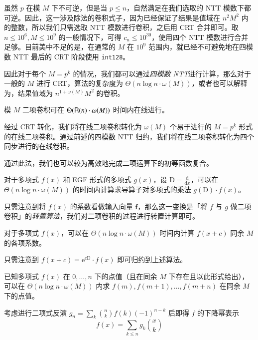 虽然 $p$ 在模 $M$ 下不可逆，但是当 $p\le n$，自然满足在我们选取的 NTT 模数下都可逆。因此，这一涉及除法的卷积式子，因为已经保证了结果是值域在 $n^2M^2$ 内的整数，所以我们只需选取 NTT 模数进行卷积，之后用 CRT 合并即可。取 $n\le 10^6, M\le 10^9$ 的一般情况下，可得 $c_n \le 10^{30}$，使用四个 NTT 模数进行合并足够。目前美中不足的是，在通常的 $M$ 在 $10^9$ 范围内，就已经不可避免地在四模数 NTT 最后的 CRT 阶段使用 \texttt{int128}。

因此对于每个 $M=p^k$ 的情况，我们都可以通过\emph{四模数 NTT}进行计算，那么对于一般的 $M$ 进行 CRT，算法的复杂度为 $\Theta(n\log n \cdot \omega(M))$，或者也可以解释为，结果值域为 $n^{1+\omega(M)}M^2$ 的卷积。

\begin{theorem}
模 $M$ 二项卷积可在 $\Theta(\mathsf R(n)\cdot \omega(M))$ 时间内在线进行。
\end{theorem}

经过 CRT 转化，我们将在线二项卷积转化为 $\omega(M)$ 个易于进行的 $M=p^k$ 形式的在线二项卷积。通过前述的四模数 NTT 归约，我们将在线二项卷积转化为四个同步进行的在线卷积。

通过此法，我们也可以较为高效地完成二项运算下的初等函数复合。

\begin{theorem}
对于多项式 $f(x)$ 和 EGF 形式的多项式 $g(x)$，设 $\mathrm{D} = \frac{\mathrm{d}}{\mathrm{d}x}$，可以在 $\Theta(n\log n \cdot \omega(M))$ 的时间内计算求导算子对多项式的乘法 $g(\mathrm{D}) \cdot f(x)$。
\end{theorem}

只需注意到将 $f(x)$ 的系数看做输入向量 $\mathbf f$，那么这一变换是「将 $f$ 与 $g$ 做二项卷积」的\emph{转置算法}，我们对二项卷积的过程进行转置计算即可。

\begin{lemma}
对于多项式 $f(x)$，可以在 $\Theta(n\log n \cdot \omega(M))$ 时间内计算 $f(x+c)$ 同余 $M$ 的各项系数。
\end{lemma}

只需注意到 $f(x+c) = \mathrm{e}^{c\mathrm{D}} \cdot f(x)$ 即可归约到上述算法。

\begin{lemma}
已知多项式 $f(x)$ 在 $0,\dots,n$ 下的点值（且在同余 $M$ 下存在且以此形式给出），可以在 $\Theta(n\log n \cdot \omega (M))$ 内求 $f(m),f(m+1),\dots,f(m+n)$ 在同余 $M$ 下的点值。
\end{lemma}

考虑进行二项式反演 $g_n = \sum_k \binom n k f(k)(-1)^{n-k}$ 后即得 $f$ 的下降幂表示
$$
f(x) = \sum_{k\le n} g_k \binom x k
$$


